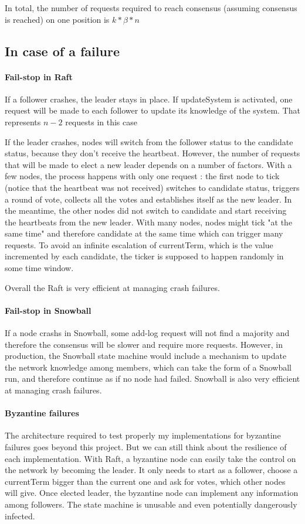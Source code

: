 \documentclass[11pt, twocolumn]{article}
\begin{document}
In total, the number of requests required to reach consensus (assuming consensus is reached) on one position is $k*\beta*n$
\subsection{In case of a failure}
\paragraph{Fail-stop in Raft}
If a follower crashes, the leader stays in place. If updateSystem is activated, one request will be made to each follower to update its knowledge of the system. That represents $n-2$ requests in this case

If the leader crashes, nodes will switch from the follower status to the candidate status, because they don't receive the heartbeat.
However, the number of requests that will be made to elect a new leader depends on a number of factors.
With a few nodes, the process happens with only one request : the first node to tick (notice that the heartbeat was not received) switches to candidate status, triggers a round of vote, collects all the votes and establishes itself as the new leader.
In the meantime, the other nodes did not switch to candidate and start receiving the heartbeats from the new leader.
With many nodes, nodes might tick "at the same time" and therefore candidate at the same time which can trigger many requests. To avoid an infinite escalation of currentTerm, which is the value incremented by each candidate, the ticker is supposed to happen randomly in some time window.

Overall the Raft is very efficient at managing crash failures.

\paragraph{Fail-stop in Snowball}
If a node crashs in Snowball, some add-log request will not find a majority and therefore the consensus will be slower and require more requests.
However, in production, the Snowball state machine would include a mechanism to update the network knowledge among members, which can take the form of a Snowball run, and therefore continue as if no node had failed.
Snowball is also very efficient at managing crash failures.

\paragraph{Byzantine failures}
The architecture required to test properly my implementations for byzantine failures goes beyond this project. But we can still think about the resilience of each implementation.
With Raft, a byzantine node can easily take the control on the network by becoming the leader. It only needs to start as a follower, choose a currentTerm bigger than the current one and ask for votes, which other nodes will give.
Once elected leader, the byzantine node can implement any information among followers. The state machine is unusable and even potentially dangerously infected.
\end{document}
